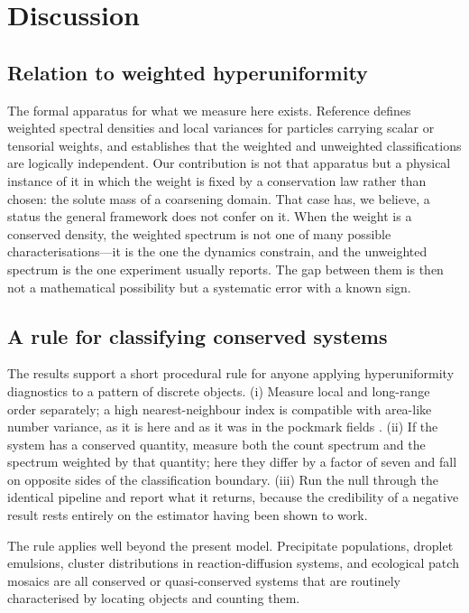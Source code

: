 \documentclass[aps,pre,twocolumn,superscriptaddress,floatfix,longbibliography]{revtex4-2}
\begin{document}
\section{Discussion}

\subsection{Relation to weighted hyperuniformity}

The formal apparatus for what we measure here exists. Reference
\cite{TorquatoWeighted2026} defines weighted spectral densities and local
variances for particles carrying scalar or tensorial weights, and establishes
that the weighted and unweighted classifications are logically independent.
Our contribution is not that apparatus but a physical instance of it in which
the weight is fixed by a conservation law rather than chosen: the solute mass
of a coarsening domain. That case has, we believe, a status the general
framework does not confer on it. When the weight is a conserved density, the
weighted spectrum is not one of many possible characterisations---it is the
one the dynamics constrain, and the unweighted spectrum is the one experiment
usually reports. The gap between them is then not a mathematical possibility
but a systematic error with a known sign.

\subsection{A rule for classifying conserved systems}

The results support a short procedural rule for anyone applying
hyperuniformity diagnostics to a pattern of discrete objects. (i) Measure
local and long-range order separately; a high nearest-neighbour index is
compatible with area-like number variance, as it is here and as it was in the
pockmark fields \cite{Chen2026}. (ii) If the system has a conserved quantity,
measure both the count spectrum and the spectrum weighted by that quantity;
here they differ by a factor of seven and fall on opposite sides of the
classification boundary. (iii) Run the null through the identical pipeline and
report what it returns, because the credibility of a negative result rests
entirely on the estimator having been shown to work.

The rule applies well beyond the present model. Precipitate populations,
droplet emulsions, cluster distributions in reaction-diffusion systems, and
ecological patch mosaics are all conserved or quasi-conserved systems that are
routinely characterised by locating objects and counting them.
\end{document}
